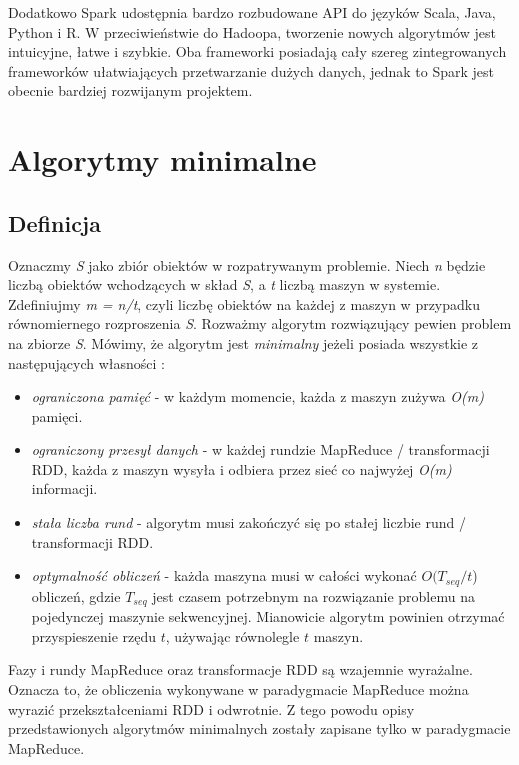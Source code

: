 \documentclass{pracamgr}
\begin{document}
Dodatkowo Spark udostępnia bardzo rozbudowane API do języków Scala, Java, Python i R. W przeciwieństwie do Hadoopa, tworzenie nowych algorytmów jest intuicyjne, łatwe i szybkie. Oba frameworki posiadają cały szereg zintegrowanych frameworków ułatwiających przetwarzanie dużych danych, jednak to Spark jest obecnie bardziej rozwijanym projektem.

\chapter{Algorytmy minimalne}\label{algorytmy_minimalne}

\section{Definicja}

Oznaczmy \textit{S} jako zbiór obiektów w rozpatrywanym problemie. Niech \textit{n} będzie liczbą obiektów wchodzących w skład \textit{S}, a \textit{t} liczbą maszyn w systemie. Zdefiniujmy \textit{m = n/t}, czyli liczbę obiektów na każdej z maszyn w przypadku równomiernego rozproszenia \textit{S}. Rozważmy algorytm rozwiązujący pewien problem na zbiorze \textit{S}. Mówimy, że algorytm jest \textit{minimalny} jeżeli posiada wszystkie z następujących własności \cite{tao2013minimal}:
\begin{itemize}
    \item \textit{ograniczona pamięć} - w każdym momencie, każda z maszyn zużywa \textit{O(m)} pamięci.
    \item \textit{ograniczony przesył danych} - w każdej rundzie MapReduce / transformacji RDD, każda z maszyn wysyła i odbiera przez sieć co najwyżej \textit{O(m)} informacji.
    \item \textit{stała liczba rund} - algorytm musi zakończyć się po stałej liczbie rund / transformacji RDD.
    \item \textit{optymalność obliczeń} - każda maszyna musi w całości wykonać \(O(T_{seq} / t\)) obliczeń, gdzie \(T_{seq}\) jest czasem potrzebnym na rozwiązanie problemu na pojedynczej maszynie sekwencyjnej. Mianowicie algorytm powinien otrzymać przyspieszenie rzędu \(t\), używając równolegle \(t\) maszyn.
\end{itemize}

Fazy i rundy MapReduce oraz transformacje RDD są wzajemnie wyrażalne. Oznacza to, że obliczenia wykonywane w paradygmacie MapReduce można wyrazić przekształceniami RDD i odwrotnie. Z tego powodu opisy przedstawionych algorytmów minimalnych zostały zapisane tylko w paradygmacie MapReduce.
\end{document}
